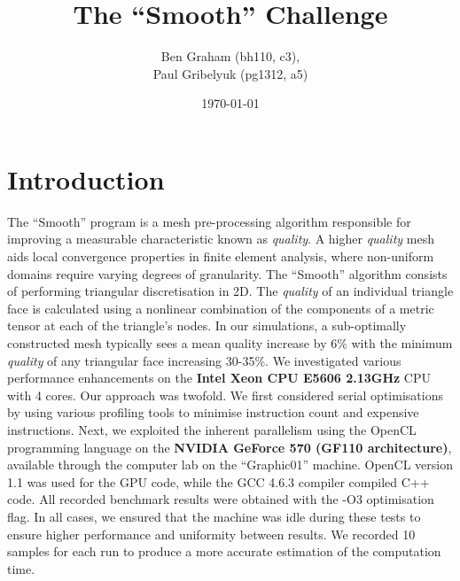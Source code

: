 \documentclass[a4paper,11pt, twocolumn]{article}
\author{
    Ben Graham (bh110, c3), \\
    Paul Gribelyuk (pg1312, a5)
}
\date{\today}
\title{The ``Smooth'' Challenge}
\begin{document}
\maketitle
\section{Introduction}
The ``Smooth'' program is a mesh pre-processing algorithm responsible for improving a measurable characteristic known as \emph{quality}.
A higher \emph{quality} mesh aids local convergence properties in finite element analysis, where non-uniform domains require varying degrees of granularity.
The ``Smooth'' algorithm consists of performing triangular discretisation in 2D.
The \emph{quality} of an individual triangle face is calculated using a nonlinear combination of the components of a metric tensor at each of the triangle's nodes.
In our simulations, a sub-optimally constructed mesh typically sees a mean quality increase by 6\% with the minimum \emph{quality} of any triangular face increasing 30-35\%.
We investigated various performance enhancements on the \textbf{Intel Xeon CPU E5606 2.13GHz} CPU with 4 cores.
Our approach was twofold.
We first considered serial optimisations by using various profiling tools to minimise instruction count and expensive instructions.
Next, we exploited the inherent parallelism using the OpenCL programming language on the \textbf{NVIDIA GeForce 570 (GF110 architecture)}, available through the computer lab on the ``Graphic01'' machine.
OpenCL version 1.1 was used for the GPU code, while the GCC 4.6.3 compiler compiled C++ code.
All recorded benchmark results were obtained with the -O3 optimisation flag.
In all cases, we ensured that the machine was idle during these tests to ensure higher performance and uniformity between results.
We recorded 10 samples for each run to produce a more accurate estimation of the computation time.
\end{document}
